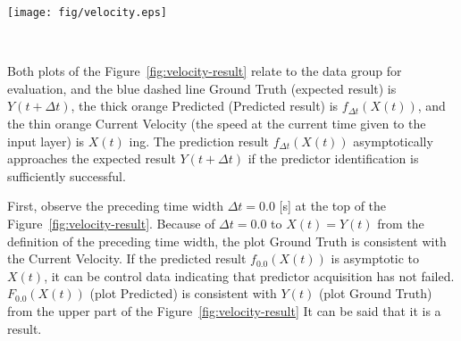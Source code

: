 \documentclass{sigchi}
\begin{document}
\begin{figure*}
\centering
  \texttt{[image: fig/velocity.eps]}
  \caption{$ x $ speed prediction result in the axial direction ($ \Delta t $ represents the preceding time width)}~\label{fig:velocity-result}
\end{figure*}


Both plots of the Figure~\ref{fig:velocity-result} relate to the data group for evaluation, and the blue dashed line Ground Truth (expected result) is $ Y (t + \Delta t) $, the thick orange Predicted (Predicted result) is $ f_ {\Delta t} (X (t)) $, and the thin orange Current Velocity (the speed at the current time given to the input layer) is $ X (t) $ ing. The prediction result $ f_ {\Delta t} (X (t)) $ asymptotically approaches the expected result $ Y (t + \Delta t) $ if the predictor identification is sufficiently successful.

First, observe the preceding time width $ \Delta t = 0.0 $ [s] at the top of the Figure~\ref{fig:velocity-result}. Because of $ \Delta t = 0.0 $ to $ X (t) = Y (t) $ from the definition of the preceding time width, the plot Ground Truth is consistent with the Current Velocity. If the predicted result $ f_ {0.0} (X (t)) $ is asymptotic to $ X (t) $, it can be control data indicating that predictor acquisition has not failed. $ F_ {0.0} (X (t)) $ (plot Predicted) is consistent with $ Y (t) $ (plot Ground Truth) from the upper part of the Figure~\ref{fig:velocity-result} It can be said that it is a result.
\end{document}

